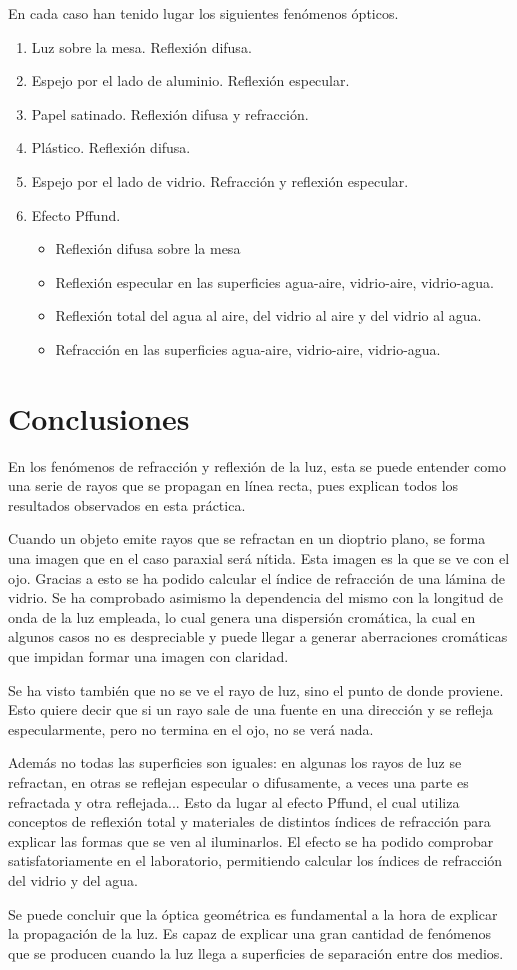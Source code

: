 \documentclass[12pt]{article}
\numberwithin{table}{section}
\numberwithin{figure}{section}
\numberwithin{equation}{section}
\begin{document}
En cada caso han tenido lugar los siguientes fenómenos ópticos.
\begin{enumerate}
	\item Luz sobre la mesa. Reflexión difusa.
	\item Espejo por el lado de aluminio. Reflexión especular.
	\item Papel satinado. Reflexión difusa y refracción.
	\item Plástico. Reflexión difusa.
	\item Espejo por el lado de vidrio. Refracción y reflexión especular.
	\item Efecto Pffund.
		\begin{itemize}
			\item Reflexión difusa sobre la mesa
			\item Reflexión especular en las superficies agua-aire, vidrio-aire, vidrio-agua.
			\item Reflexión total del agua al aire, del vidrio al aire y del vidrio al agua.
			\item Refracción en las superficies agua-aire, vidrio-aire, vidrio-agua.
		\end{itemize}
\end{enumerate}

\section{Conclusiones}
En los fenómenos de refracción y reflexión de la luz, esta se puede entender como una serie de rayos que se propagan en línea recta, pues explican todos los resultados observados en esta práctica.

Cuando un objeto emite rayos que se refractan en un dioptrio plano, se forma una imagen que en el caso paraxial será nítida. Esta imagen es la que se ve con el ojo. Gracias a esto se ha podido calcular el índice de refracción de una lámina de vidrio. Se ha comprobado asimismo la dependencia del mismo con la longitud de onda de la luz empleada, lo cual genera una dispersión cromática, la cual en algunos casos no es despreciable y puede llegar a generar aberraciones cromáticas que impidan formar una imagen con claridad.

Se ha visto también que no se ve el rayo de luz, sino el punto de donde proviene. Esto quiere decir que si un rayo sale de una fuente en una dirección y se refleja especularmente, pero no termina en el ojo, no se verá nada.

Además no todas las superficies son iguales: en algunas los rayos de luz se refractan, en otras se reflejan especular o difusamente, a veces una parte es refractada y otra reflejada... Esto da lugar al efecto Pffund, el cual utiliza conceptos de reflexión total y materiales de distintos índices de refracción para explicar las formas que se ven al iluminarlos. El efecto se ha podido comprobar satisfatoriamente en el laboratorio, permitiendo calcular los índices de refracción del vidrio y del agua.

Se puede concluir que la óptica geométrica es fundamental a la hora de explicar la propagación de la luz. Es capaz de explicar una gran cantidad de fenómenos que se producen cuando la luz llega a superficies de separación entre dos medios.
\end{document}

